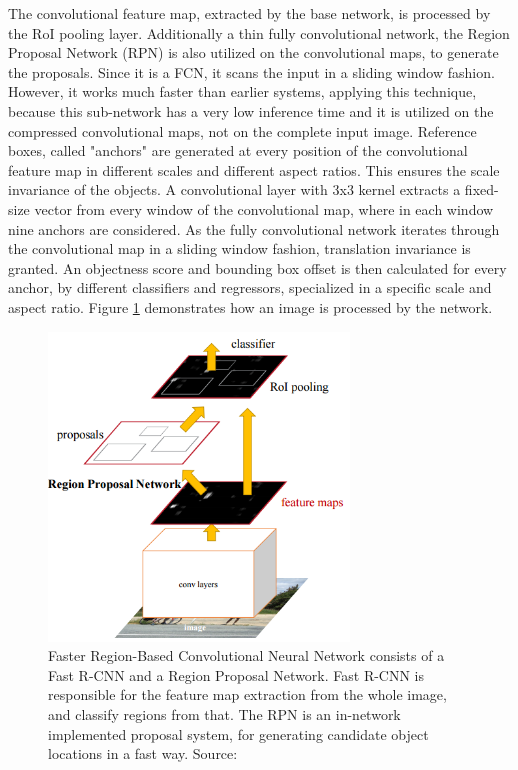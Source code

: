 The convolutional feature map, extracted by the base network, is processed by the RoI pooling layer. Additionally a thin fully convolutional network, the Region Proposal Network (RPN) is also utilized on the convolutional maps, to generate the proposals. Since it is a FCN, it scans the input in a sliding window fashion. However, it works much faster than earlier systems, applying this technique, because this sub-network has a very low inference time and it is utilized on the compressed convolutional maps, not on the complete input image. Reference boxes, called "anchors" are generated at every position of the convolutional feature map in different scales and different aspect ratios. This ensures the scale invariance of the objects. A convolutional layer with 3x3 kernel extracts a fixed-size vector from every window of the convolutional map, where in each window nine anchors are considered. As the fully convolutional network iterates through the convolutional map in a sliding window fashion, translation invariance is granted. An objectness score and bounding box offset is then calculated for every anchor, by different classifiers and regressors, specialized in a specific scale and aspect ratio. Figure \ref{fig:faster-rcnn} demonstrates how an image is processed by the network.
\begin{figure}[h!]
	\centering
	\includegraphics[width=8cm]{images/mt/faster-rcnn.png}
	\caption{Faster Region-Based Convolutional Neural Network consists of a Fast R-CNN and a Region Proposal Network. Fast R-CNN is responsible for the feature map extraction from the whole image, and classify regions from that. The RPN is an in-network implemented proposal system, for generating candidate object locations in a fast way. Source: \cite{NIPS2015_5638}}
	\label{fig:faster-rcnn}
\end{figure}
\bigbreak
